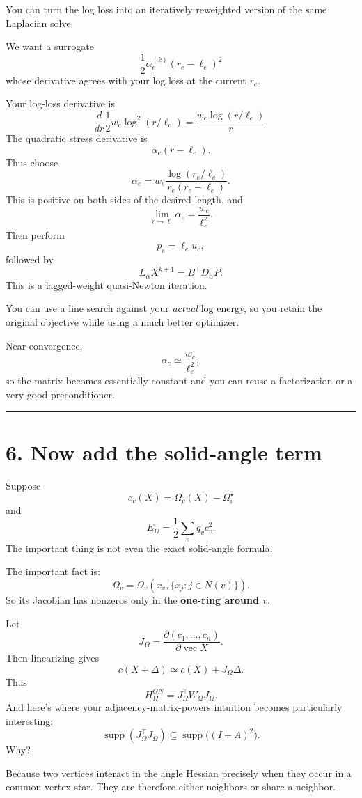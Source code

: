 \documentclass[11pt]{article}
\begin{document}
You can turn the log loss into an iteratively reweighted version of the same
Laplacian solve.

We want a surrogate
\[
\frac12\alpha_e^{(k)}
(r_e-\ell_e)^2
\]
whose derivative agrees with your log loss at the current \(r_e\).

Your log-loss derivative is
\[
\frac{d}{dr}
\frac12 w_e\log^2(r/\ell_e)
=
\frac{w_e\log(r/\ell_e)}{r}.
\]
The quadratic stress derivative is
\[
\alpha_e(r-\ell_e).
\]
Thus choose
\[
\boxed{
\alpha_e
=
w_e
\frac{\log(r_e/\ell_e)}
{r_e(r_e-\ell_e)}.
}
\]
This is positive on both sides of the desired length, and
\[
\lim_{r\rightarrow\ell}
\alpha_e
=
\frac{w_e}{\ell_e^2}.
\]
Then perform
\[
p_e=\ell_eu_e,
\]
followed by
\[
\boxed{
L_{\alpha} X^{k+1}
=
B^\top D_{\alpha}P.
}
\]
This is a lagged-weight quasi-Newton iteration.

You can use a line search against your \emph{actual} log energy, so you
retain the original objective while using a much better optimizer.

Near convergence,
\[
\alpha_e\simeq\frac{w_e}{\ell_e^2},
\]
so the matrix becomes essentially constant and you can reuse a
factorization or a very good preconditioner.

\bigskip\hrule

\section*{6. Now add the solid-angle term}

Suppose
\[
c_v(X)
=
\Omega_v(X)-\Omega_v^\star
\]
and
\[
E_\Omega
=
\frac12
\sum_v q_v c_v^2.
\]
The important thing is not even the exact solid-angle formula.

The important fact is:
\[
\Omega_v
=
\Omega_v\left(x_v,\{x_j:j\in N(v)\}\right).
\]
So its Jacobian has nonzeros only in the \textbf{one-ring around \(v\)}.

Let
\[
J_\Omega
=
\frac{\partial(c_1,\ldots,c_n)}
{\partial\operatorname{vec}X}.
\]
Then linearizing gives
\[
c(X+\Delta)
\simeq
c(X)+J_\Omega\Delta.
\]
Thus
\[
H_\Omega^{GN}
=
J_\Omega^\top W_\Omega J_\Omega.
\]
And here's where your adjacency-matrix-powers intuition becomes
particularly interesting:
\[
\boxed{
\operatorname{supp}
(J_\Omega^\top J_\Omega)
\subseteq
\operatorname{supp}\big((I+A)^2\big).
}
\]
Why?

Because two vertices interact in the angle Hessian precisely when they
occur in a common vertex star. They are therefore either neighbors or share
a neighbor.
\end{document}
